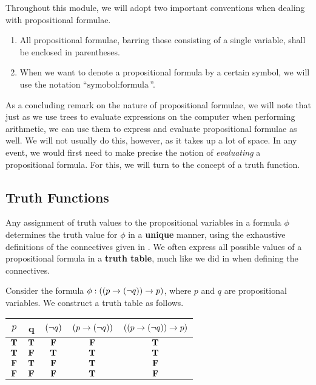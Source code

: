\begin{boxconvention}
    Throughout this module, we will adopt two important conventions when dealing with propositional formulae.
    \begin{enumerate}[noitemsep]
        \item All propositional formulae, barring those consisting of a single variable, shall be enclosed in parentheses.
        \item When we want to denote a propositional formula by a certain symbol, we will use the notation ``$\text{symobol} : \text{formula}$''.
    \end{enumerate}
\end{boxconvention}

As a concluding remark on the nature of propositional formulae, we will note that just as we use trees to evaluate expressions on the computer when performing arithmetic, we can use them to express and evaluate propositional formulae as well. We will not usually do this, however, as it takes up a lot of space. In any event, we would first need to make precise the notion of \textit{evaluating} a propositional formula. For this, we will turn to the concept of a truth function.

\subsection{Truth Functions}

Any assignment of truth values to the propositional variables in a formula $\phi$ determines the truth value for $\phi$ in a \textbf{unique} manner, using the exhaustive definitions of the connectives given in . We often express all possible values of a propositional formula in a \textbf{truth table}, much like we did in  when defining the connectives.

\begin{boxexample}
    Consider the formula $\phi : \left( \left( p \to \left( \neg q \right) \right) \to p \right)$, where $p$ and $q$ are propositional variables. We construct a truth table as follows.
    \begin{table}[H]
        \centering
        \begin{tabular}{cc|cc|c}
        $p$ & q & $\left( \neg q \right)$ & $\left( p \to \left( \neg q \right) \right)$ & $\left( \left( p \to \left( \neg q \right) \right) \to p \right)$ \\ \hline
        $\mathbf{T}$ & $\mathbf{T}$ & $\mathbf{F}$ & $\mathbf{F}$ & $\mathbf{T}$ \\
        $\mathbf{T}$ & $\mathbf{F}$ & $\mathbf{T}$ & $\mathbf{T}$ & $\mathbf{T}$ \\
        $\mathbf{F}$ & $\mathbf{T}$ & $\mathbf{F}$ & $\mathbf{T}$ & $\mathbf{F}$ \\
        $\mathbf{F}$ & $\mathbf{F}$ & $\mathbf{F}$ & $\mathbf{T}$ & $\mathbf{F}$
        \end{tabular}
    \end{table}
\end{boxexample}

